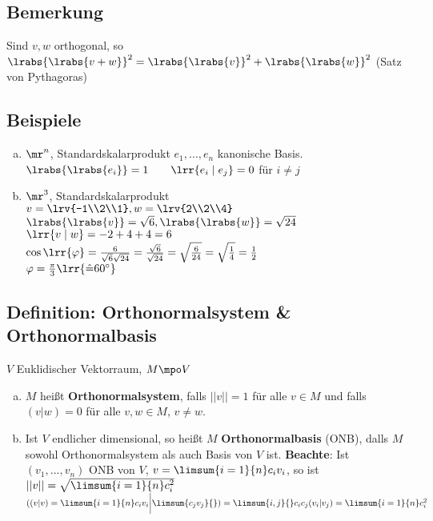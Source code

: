 \subsection{Bemerkung}
	Sind $v,w$ orthogonal, so $\lrabs{\lrabs{v+w}}^2=\lrabs{\lrabs{v}}^2+\lrabs{\lrabs{w}}^2$ (Satz von Pythagoras)

\subsection{Beispiele}
    \begin{enumerate}[a)]
	\item $\mr^n$, Standardskalarprodukt $e_1,\dots,e_n$ kanonische Basis.\\
		$\lrabs{\lrabs{e_i}}=1\qquad\lrr{e_i\mid e_j}=0$ für $i\neq j$
	\item $\mr^3$, Standardskalarprodukt\\
		$v=\lrv{-1\\2\\1}, w=\lrv{2\\2\\4}$\\
		$\lrabs{\lrabs{v}}=\sqrt{6},\lrabs{\lrabs{w}}=\sqrt{24}$\\
		$\lrr{v\mid w}=-2+4+4=6$\\
		$\cos\lrr{\varphi}=\frac{6}{\sqrt{6}\sqrt{24}}=\frac{\sqrt{6}}{\sqrt{24}}=\sqrt{\frac{6}{24}}=\sqrt{\frac{1}{4}}=\frac{1}{2}$\\
		$\varphi=\frac{\pi}{3}\lrr{\hat{=}60^\circ}$
    \end{enumerate}
\subsection{Definition: Orthonormalsystem \& Orthonormalbasis}
	$ V $ Euklidischer Vektorraum, $ M\mpo V $
	\begin{enumerate}[a)]
		\item $ M $ heißt \textbf{Orthonormalsystem}, falls $ ||v||=1 $ für alle $ v\in M $ und falls $ (v|w)=0 $ für alle $ v,w\in M $, $ v\neq w $.
		\item Ist $ V $ endlicher dimensional, so heißt $ M $ \textbf{Orthonormalbasis} (ONB), dalls $ M $ sowohl Orthonormalsystem als auch Basis von $ V $ ist.
      \textbf{Beachte}: Ist $ (v_1,...,v_n) $ ONB von $ V $, $ v=\limsum{i=1}{n}c_iv_i $, so ist $ ||v||=\sqrt{\limsum{i=1}{n}c_i^2} $\\
      $ ((v|v)=\limsum{i=1}{n}c_iv_i\bigg|\limsum{c_jv_j}{})=\limsum{i,j}{}c_ic_j(v_i|v_j)=\limsum{i=1}{n}c_i^2 $
	\end{enumerate}
